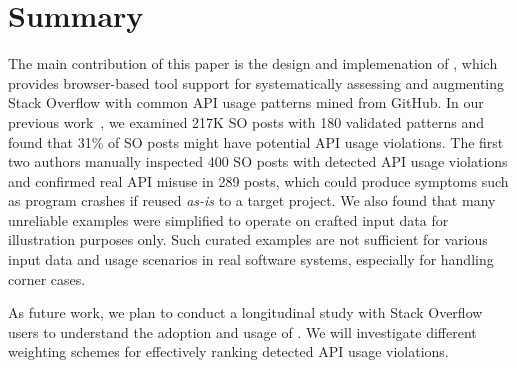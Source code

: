 \section{Summary}
\label{sec:summary}
The main contribution of this paper is the design and implemenation of {\tool}, which provides browser-based tool support for systematically assessing and augmenting Stack Overflow with common API usage patterns mined from GitHub. In our previous work~\cite{zhang2018code}, we examined 217K SO posts with 180 validated patterns and found that 31\% of SO posts might have potential API usage violations. The first two authors manually inspected 400 SO posts with detected API usage violations and confirmed real API misuse in 289 posts, which could produce symptoms such as program crashes if reused {\em as-is} to a target project. We also found that many unreliable examples were simplified to operate on crafted input data for illustration purposes only. Such curated examples are not sufficient for various input data and usage scenarios in real software systems, especially for handling corner cases. %


As future work, we plan to conduct a longitudinal study with Stack Overflow users to understand the adoption and usage of {\tool}. We will investigate different weighting schemes for effectively ranking detected API usage violations. %
